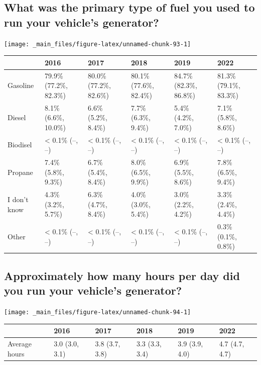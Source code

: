 \documentclass[
]{book}
\begin{document}
\hypertarget{what-was-the-primary-type-of-fuel-you-used-to-run-your-vehicles-generator}{%
\subsection{What was the primary type of fuel you used to run your vehicle's generator?}\label{what-was-the-primary-type-of-fuel-you-used-to-run-your-vehicles-generator}}

\texttt{[image: \_main\_files/figure-latex/unnamed-chunk-93-1]}

\begin{table}
\centering
\begin{tabular}[t]{>{}l|>{}l|>{}l|>{}l|>{}l|>{}l}
\hline
  & 2016 & 2017 & 2018 & 2019 & 2022\\
\hline
Gasoline & 79.9\% (77.2\%, 82.3\%) & 80.0\% (77.2\%, 82.6\%) & 80.1\% (77.6\%, 82.4\%) & 84.7\% (82.3\%, 86.8\%) & 81.3\% (79.1\%, 83.3\%)\\
\hline
Diesel & 8.1\% (6.6\%, 10.0\%) & 6.6\% (5.2\%, 8.4\%) & 7.7\% (6.3\%, 9.4\%) & 5.4\% (4.2\%, 7.0\%) & 7.1\% (5.8\%, 8.6\%)\\
\hline
Biodisel & < 0.1\% (--, --) & < 0.1\% (--, --) & < 0.1\% (--, --) & < 0.1\% (--, --) & < 0.1\% (--, --)\\
\hline
Propane & 7.4\% (5.8\%, 9.3\%) & 6.7\% (5.4\%, 8.4\%) & 8.0\% (6.5\%, 9.9\%) & 6.9\% (5.5\%, 8.6\%) & 7.8\% (6.5\%, 9.4\%)\\
\hline
I don't know & 4.3\% (3.2\%, 5.7\%) & 6.3\% (4.7\%, 8.4\%) & 4.0\% (3.0\%, 5.4\%) & 3.0\% (2.2\%, 4.2\%) & 3.3\% (2.4\%, 4.4\%)\\
\hline
Other & < 0.1\% (--, --) & < 0.1\% (--, --) & < 0.1\% (--, --) & < 0.1\% (--, --) & 0.3\% (0.1\%, 0.8\%)\\
\hline
\end{tabular}
\end{table}

\hypertarget{approximately-how-many-hours-per-day-did-you-run-your-vehicles-generator}{%
\subsection{Approximately how many hours per day did you run your vehicle's generator?}\label{approximately-how-many-hours-per-day-did-you-run-your-vehicles-generator}}

\texttt{[image: \_main\_files/figure-latex/unnamed-chunk-94-1]}

\begin{table}
\centering
\begin{tabular}[t]{>{}l|>{}l|>{}l|>{}l|>{}l|>{}l}
\hline
  & 2016 & 2017 & 2018 & 2019 & 2022\\
\hline
Average hours & 3.0 (3.0, 3.1) & 3.8 (3.7, 3.8) & 3.3 (3.3, 3.4) & 3.9 (3.9, 4.0) & 4.7 (4.7, 4.7)\\
\hline
\end{tabular}
\end{table}
\end{document}
